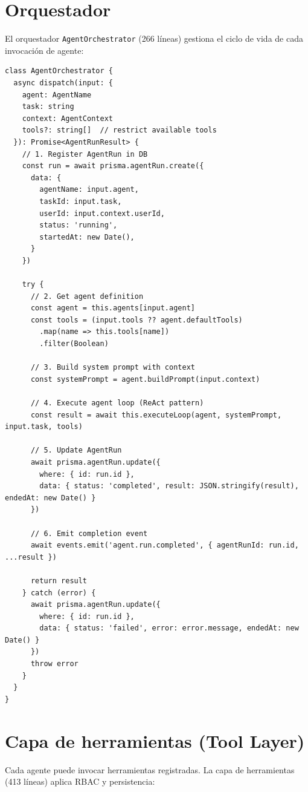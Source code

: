 \documentclass[10pt,a4paper,oneside]{report}
\begin{document}
\section{Orquestador}
El orquestador \texttt{AgentOrchestrator} (266 líneas) gestiona el ciclo de vida de cada invocación de agente:

\begin{lstlisting}[style=ts,caption={Método dispatch del orquestador}]
class AgentOrchestrator {
  async dispatch(input: {
    agent: AgentName
    task: string
    context: AgentContext
    tools?: string[]  // restrict available tools
  }): Promise<AgentRunResult> {
    // 1. Register AgentRun in DB
    const run = await prisma.agentRun.create({
      data: {
        agentName: input.agent,
        taskId: input.task,
        userId: input.context.userId,
        status: 'running',
        startedAt: new Date(),
      }
    })

    try {
      // 2. Get agent definition
      const agent = this.agents[input.agent]
      const tools = (input.tools ?? agent.defaultTools)
        .map(name => this.tools[name])
        .filter(Boolean)

      // 3. Build system prompt with context
      const systemPrompt = agent.buildPrompt(input.context)

      // 4. Execute agent loop (ReAct pattern)
      const result = await this.executeLoop(agent, systemPrompt, input.task, tools)

      // 5. Update AgentRun
      await prisma.agentRun.update({
        where: { id: run.id },
        data: { status: 'completed', result: JSON.stringify(result), endedAt: new Date() }
      })

      // 6. Emit completion event
      await events.emit('agent.run.completed', { agentRunId: run.id, ...result })

      return result
    } catch (error) {
      await prisma.agentRun.update({
        where: { id: run.id },
        data: { status: 'failed', error: error.message, endedAt: new Date() }
      })
      throw error
    }
  }
}
\end{lstlisting}

\section{Capa de herramientas (Tool Layer)}
Cada agente puede invocar herramientas registradas. La capa de herramientas (413 líneas) aplica RBAC y persistencia:
\end{document}
